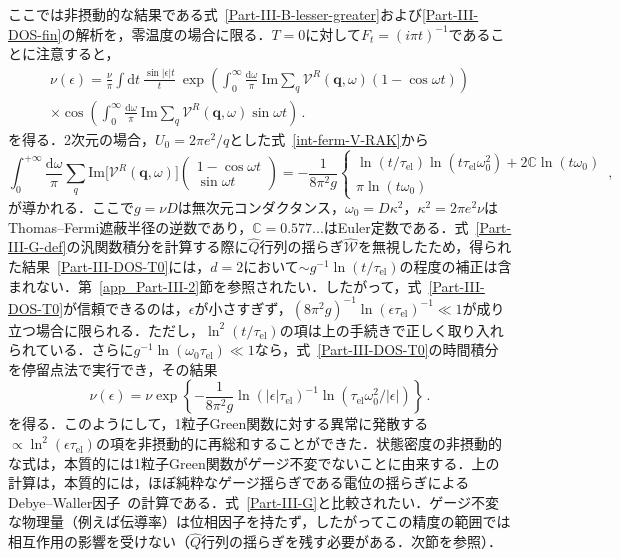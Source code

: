 \documentclass[a4paper,11pt]{ltjsarticle}
\def\d{\mathrm{d}}
\def\qo{(\mathbf{q},\omega)}
\def\tauel{\tau_{\mathrm{el}}}
\begin{document}
ここでは非摂動的な結果である式~\eqref{Part-III-B-lesser-greater}および\eqref{Part-III-DOS-fin}の解析を，零温度の場合に限る．$T=0$に対して$F_{t}=(i\pi t)^{-1}$であることに注意すると，
\begin{eqnarray}\label{Part-III-DOS-T0}
\nu(\epsilon)=\frac{\nu}{\pi}\int\d t\ \frac{\sin|\epsilon|t}{t}\
\exp\left(\int^{\infty}_{0}\frac{\d\omega}{\pi}\
\mathrm{Im}\sum_{q}\mathcal{V}^{R}\qo(1-\cos\omega
t)\right)\nonumber\\
\times\cos\left(\int^{\infty}_{0}\frac{\d\omega}{\pi}\
\mathrm{Im}\sum_{q}\mathcal{V}^{R}\qo\sin\omega t\right)\,.
\end{eqnarray}
を得る．2次元の場合，$U_{0}=2\pi
e^{2}/q$とした式~\eqref{int-ferm-V-RAK}から
\begin{equation}\label{Part-III-exponent-integral}
\int^{+\infty}_{0}\frac{\d\omega}{\pi}\sum_{q}\mathrm{Im}
\big[\mathcal{V}^{R}\qo\big]\left(\begin{array}{c}1-\cos\omega t \\
\sin\omega t\end{array}\right)=-\frac{1}{8\pi^{2}g}\left\{
\begin{array}{l}\ln(t/\tauel)\ln(t\tauel\omega^{2}_{0})+2\mathbb{C}\ln(t\omega_{0})
\\ \pi\ln(t\omega_{0})\end{array}\right.\,,
\end{equation}
が導かれる．ここで$g=\nu D$は無次元コンダクタンス，$\omega_{0}=D\kappa^{2}$，$\kappa^{2}=2\pi e^{2}\nu$はThomas--Fermi遮蔽半径の逆数であり，$\mathbb{C}=0.577...$はEuler定数である．式~\eqref{Part-III-G-def}の汎関数積分を計算する際に$\hat Q$行列の揺らぎ$\hat{\mathcal{W}}$を無視したため，得られた結果~\eqref{Part-III-DOS-T0}には，$d=2$において$\sim g^{-1}\ln(t/\tau_{\mathrm{el}})$の程度の補正は含まれない．第~\ref{app_Part-III-2}節を参照されたい．したがって，式~\eqref{Part-III-DOS-T0}が信頼できるのは，$\epsilon$が小さすぎず，$(8\pi^{2}g)^{-1}\ln(\epsilon\tauel)^{-1}\ll 1$が成り立つ場合に限られる．ただし，$\ln^{2}(t/\tauel)$の項は上の手続きで正しく取り入れられている．さらに$g^{-1}\ln(\omega_{0}\tauel)\ll1$なら，式~\eqref{Part-III-DOS-T0}の時間積分を停留点法で実行でき，その結果
\begin{equation}
\nu(\epsilon)=\nu\exp\left\{-\frac{1}{8\pi^{2}g}\ln(|\epsilon|\tauel)^{-1}
\ln(\tauel\omega^{2}_{0}/|\epsilon|)\right\}\,.
\end{equation}
を得る．このようにして，1粒子Green関数に対する異常に発散する$\propto\ln^{2}(\epsilon\tauel)$の項を非摂動的に再総和することができた．状態密度の非摂動的な式は，本質的には1粒子Green関数がゲージ不変でないことに由来する．上の計算は，本質的には，ほぼ純粋なゲージ揺らぎである電位の揺らぎによるDebye--Waller因子~\cite{Finkel'stein94}の計算である．式~\eqref{Part-III-G}と比較されたい．ゲージ不変な物理量（例えば伝導率）は位相因子を持たず，したがってこの精度の範囲では相互作用の影響を受けない（$\hat Q$行列の揺らぎを残す必要がある．次節を参照）．
\end{document}
